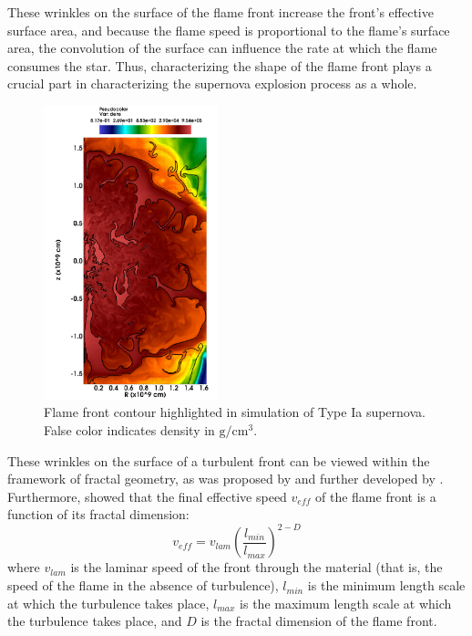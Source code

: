 \documentclass[iop]{emulateapj}
\begin{document}
These wrinkles on the surface of the flame front increase the front's effective surface area, and because the flame speed is proportional to the flame's surface area, the convolution of the surface can influence the rate at which the flame consumes the star. Thus, characterizing the shape of the flame front plays a crucial part in characterizing the supernova explosion process as a whole.

\begin{figure}
\begin{center}
\includegraphics[width=0.45\textwidth,clip=true]{Graphics/n7d1r10t15b0011_cropped.png}
\caption{Flame front contour highlighted in simulation of Type Ia supernova. False color indicates density in $\mathrm{g/cm^3}$.
\label{f:flamefrontwithcontour}}
\end{center}
\end{figure} 

These wrinkles on the surface of a turbulent front can be viewed within the framework of fractal geometry, as was proposed by \cite{Mandelbrot1975} and further developed by \cite{Timmes1994}. Furthermore, \cite{Timmes1994} showed that the final effective speed $v_{eff}$ of the flame front is a function of its fractal dimension:
\begin{equation} 
	v_{eff} = v_{lam} \left(\frac{l_{min}}{l_{max}}\right)^{2 - D}
\end{equation}
where $v_{lam}$ is the laminar speed of the front through the material (that is, the speed of the flame in the absence of turbulence), $l_{min}$ is the minimum length scale at which the turbulence takes place, $l_{max}$ is the maximum length scale at which the turbulence takes place, and $ D $ is the fractal dimension of the flame front.
\end{document}
